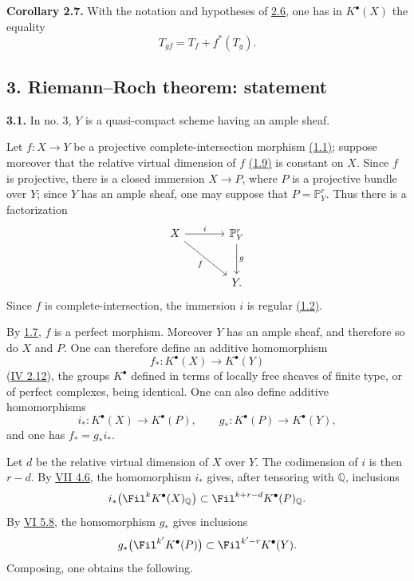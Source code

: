 \textbf{Corollary 2.7.} With the notation and hypotheses of \hyperlink{sga6.e08.prop.2-6}{2.6}, one has in $K^{\bullet}(X)$ the equality
\[
T_{gf}=T_f+f^*(T_g).
\]

\subsection*{3. Riemann--Roch theorem: statement}

\textbf{3.1.} In no. 3, $Y$ is a quasi-compact scheme having an ample sheaf.

Let $f:X\to Y$ be a projective complete-intersection morphism \hyperlink{sga6.e08.def.1-1}{(1.1)}; suppose moreover that the relative virtual dimension of $f$ \hyperlink{sga6.e08.def.1-9}{(1.9)} is constant on $X$. Since $f$ is projective, there is a closed immersion $X\to P$, where $P$ is a projective bundle over $Y$; since $Y$ has an ample sheaf, one may suppose that $P=\mathbb P^r_Y$. Thus there is a factorization
\[
\begin{tikzcd}[column sep=large,row sep=large]
X \arrow[r,"i"] \arrow[dr,"f"'] & \mathbb P^r_Y \arrow[d,"g"]\\
& Y.
\end{tikzcd}
\]
Since $f$ is complete-intersection, the immersion $i$ is regular \hyperlink{sga6.e08.prop.1-2}{(1.2)}.

By \hyperlink{sga6.e08.prop.1-7}{1.7}, $f$ is a perfect morphism. Moreover $Y$ has an ample sheaf, and therefore so do $X$ and $P$. One can therefore define an additive homomorphism
\[
f_*:K^{\bullet}(X)\longrightarrow K^{\bullet}(Y)
\]
(\hyperlink{sga6.e04.para.2-12}{IV 2.12}), the groups $K^{\bullet}$ defined in terms of locally free sheaves of finite type, or of perfect complexes, being identical. One can also define additive homomorphisms
\[
i_*:K^{\bullet}(X)\longrightarrow K^{\bullet}(P),
\qquad
 g_*:K^{\bullet}(P)\longrightarrow K^{\bullet}(Y),
\]
and one has $f_*=g_*i_*$.

Let $d$ be the relative virtual dimension of $X$ over $Y$. The codimension of $i$ is then $r-d$. By \hyperlink{sga6.e07.thm.4-6}{VII 4.6}, the homomorphism $i_*$ gives, after tensoring with $\mathbb Q$, inclusions
\[
i_*\bigl(\Fil^kK^{\bullet}(X)_{\mathbb Q}\bigr)
\subset
\Fil^{k+r-d}K^{\bullet}(P)_{\mathbb Q}.
\]
By \hyperlink{sga6.e06.cor.5-8}{VI 5.8}, the homomorphism $g_*$ gives inclusions
\[
g_*\bigl(\Fil^{k'}K^{\bullet}(P)\bigr)
\subset
\Fil^{k'-r}K^{\bullet}(Y).
\]
Composing, one obtains the following.

